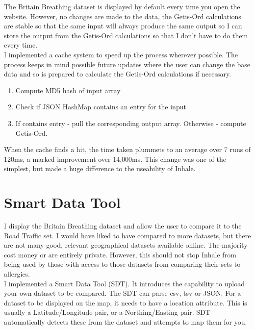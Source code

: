 The Britain Breathing dataset is displayed by default every time you open the website. However, no changes are made to the data, the Getis-Ord calculations are stable so that the same input will always produce the same output so I can store the output from the Getis-Ord calculations so that I don't have to do them every time.\\

I implemented a cache system to speed up the process wherever possible. The process keeps in mind possible future updates where the user can change the base data and so is prepared to calculate the Getis-Ord calculations if necessary.\\

\begin{enumerate}
    \item Compute MD5 hash of input array
    \item Check if JSON HashMap contains an entry for the input
    \item If contains entry - pull the corresponding output array. Otherwise - compute Getis-Ord.
\end{enumerate}

When the cache finds a hit, the time taken plummets to an average over 7 runs of 120ms, a marked improvement over 14,000ms. This change was one of the simplest, but made a huge difference to the useability of Inhale.

\section{Smart Data Tool}

I display the Britain Breathing dataset and allow the user to compare it to the Road Traffic set. I would have liked to have compared to more datasets, but there are not many good, relevant geographical datasets available online. The majority cost money or are entirely private. However, this should not stop Inhale from being used by those with access to those datasets from comparing their sets to allergies.\\

I implemented a Smart Data Tool (SDT). It introduces the capability to upload your own dataset to be compared. The SDT can parse csv, tsv or JSON. For a dataset to be displayed on the map, it needs to have a location attribute. This is usually a Latitude/Longitude pair, or a Northing/Easting pair. SDT automatically detects these from the dataset and attempts to map them for you.\\

